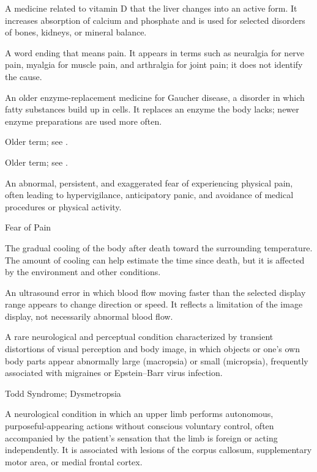  A medicine related to vitamin D that the liver changes into an active form. It increases absorption of calcium and phosphate and is used for selected disorders of bones, kidneys, or mineral balance.

 A word ending that means pain. It appears in terms such as neuralgia for nerve pain, myalgia for muscle pain, and arthralgia for joint pain; it does not identify the cause.

 An older enzyme-replacement medicine for Gaucher disease, a disorder in which fatty substances build up in cells. It replaces an enzyme the body lacks; newer enzyme preparations are used more often.

 Older term; see .

 Older term; see .

 An abnormal, persistent, and exaggerated fear of experiencing physical pain, often leading to hypervigilance, anticipatory panic, and avoidance of medical procedures or physical activity.

\synonyms
Fear of Pain

 The gradual cooling of the body after death toward the surrounding temperature. The amount of cooling can help estimate the time since death, but it is affected by the environment and other conditions.

 An ultrasound error in which blood flow moving faster than the selected display range appears to change direction or speed. It reflects a limitation of the image display, not necessarily abnormal blood flow.

 A rare neurological and perceptual condition characterized by transient distortions of visual perception and body image, in which objects or one's own body parts appear abnormally large (macropsia) or small (micropsia), frequently associated with migraines or Epstein--Barr virus infection.

\synonyms
Todd Syndrome; Dysmetropsia

 A neurological condition in which an upper limb performs autonomous, purposeful-appearing actions without conscious voluntary control, often accompanied by the patient's sensation that the limb is foreign or acting independently. It is associated with lesions of the corpus callosum, supplementary motor area, or medial frontal cortex.


